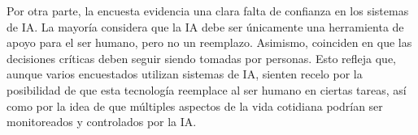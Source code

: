 \documentclass[12pt,a4paper]{article}
\begin{document}
Por otra parte, la encuesta evidencia una clara falta de confianza en los sistemas de IA. 
La mayoría considera que la IA debe ser únicamente una herramienta de apoyo para el ser humano, 
pero no un reemplazo. Asimismo, coinciden en que las decisiones críticas deben seguir siendo tomadas por personas. 
Esto refleja que, aunque varios encuestados utilizan sistemas de IA, sienten recelo por la posibilidad de que esta tecnología reemplace al ser humano 
en ciertas tareas, así como por la idea de que múltiples aspectos de la vida cotidiana podrían ser monitoreados y controlados por la IA.
\end{document}

